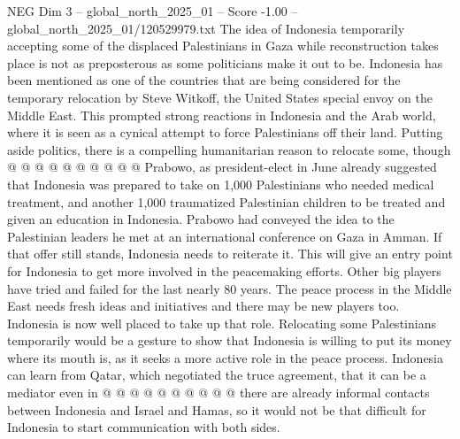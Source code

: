 \begin{textsample}{NEG Dim 3 – global\_north\_2025\_01 – Score -1.00 – global\_north\_2025\_01/120529979.txt}
The idea of Indonesia temporarily accepting some of the displaced Palestinians in Gaza while reconstruction takes place is not as preposterous as some politicians make it out to be.
Indonesia has been mentioned as one of the countries that are being considered for the temporary relocation by Steve Witkoff, the United States special envoy on the Middle East.
This prompted strong reactions in Indonesia and the Arab world, where it is seen as a cynical attempt to force Palestinians off their land.
Putting aside politics, there is a compelling humanitarian reason to relocate some, though @ @ @ @ @ @ @ @ @ @ Prabowo, as president-elect in June already suggested that Indonesia was prepared to take on 1,000 Palestinians who needed medical treatment, and another 1,000 traumatized Palestinian children to be treated and given an education in Indonesia.
Prabowo had conveyed the idea to the Palestinian leaders he met at an international conference on Gaza in Amman.
If that offer still stands, Indonesia needs to reiterate it.
This will give an entry point for Indonesia to get more involved in the peacemaking efforts.
Other big players have tried and failed for the last nearly 80 years.
The peace process in the Middle East needs fresh ideas and initiatives and there may be new players too.
Indonesia is now well placed to take up that role.
Relocating some Palestinians temporarily would be a gesture to show that Indonesia is willing to put its money where its mouth is, as it seeks a more active role in the peace process.
Indonesia can learn from Qatar, which negotiated the truce agreement, that it can be a mediator even in @ @ @ @ @ @ @ @ @ @ there are already informal contacts between Indonesia and Israel and Hamas, so it would not be that difficult for Indonesia to start communication with both sides.

\end{textsample}
